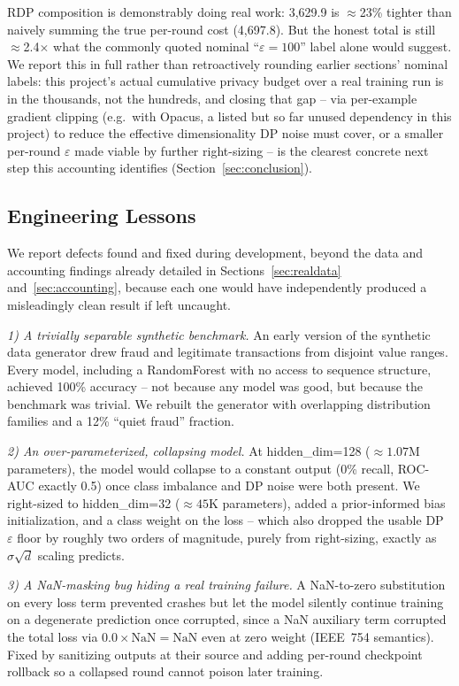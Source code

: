 \documentclass[12pt]{svproc}
\begin{document}
RDP composition is demonstrably doing real work: 3{,}629.9 is
$\approx$23\% tighter than naively summing the true per-round cost
(4{,}697.8). But the honest total is still $\approx$2.4$\times$ what
the commonly quoted nominal ``$\varepsilon=100$'' label alone would
suggest. We report this in full rather than retroactively rounding
earlier sections' nominal labels: this project's actual cumulative
privacy budget over a real training run is in the thousands, not the
hundreds, and closing that gap -- via per-example gradient clipping
(e.g.\ with Opacus, a listed but so far unused dependency in this
project) to reduce the effective dimensionality DP noise must cover, or
a smaller per-round $\varepsilon$ made viable by further right-sizing --
is the clearest concrete next step this accounting identifies
(Section~\ref{sec:conclusion}).

\subsection{Engineering Lessons}
\label{sec:lessons}
We report defects found and fixed during development, beyond the data
and accounting findings already detailed in
Sections~\ref{sec:realdata} and~\ref{sec:accounting}, because each one
would have independently produced a misleadingly clean result if left
uncaught.

\textit{1) A trivially separable synthetic benchmark.} An early version
of the synthetic data generator drew fraud and legitimate transactions
from disjoint value ranges. Every model, including a RandomForest with
no access to sequence structure, achieved 100\% accuracy -- not because
any model was good, but because the benchmark was trivial. We rebuilt
the generator with overlapping distribution families and a 12\%
``quiet fraud'' fraction.

\textit{2) An over-parameterized, collapsing model.} At
hidden\_dim=128 ($\approx1.07$M parameters), the model would collapse
to a constant output (0\% recall, ROC-AUC exactly 0.5) once class
imbalance and DP noise were both present. We right-sized to
hidden\_dim=32 ($\approx45$K parameters), added a prior-informed bias
initialization, and a class weight on the loss -- which also dropped
the usable DP $\varepsilon$ floor by roughly two orders of magnitude,
purely from right-sizing, exactly as $\sigma\sqrt{d}$ scaling predicts.

\textit{3) A NaN-masking bug hiding a real training failure.}
A NaN-to-zero substitution on every loss term prevented crashes but let
the model silently continue training on a degenerate prediction once
corrupted, since a NaN auxiliary term corrupted the total loss via
$0.0 \times \mathrm{NaN} = \mathrm{NaN}$ even at zero weight
(IEEE~754 semantics). Fixed by sanitizing outputs at their source and
adding per-round checkpoint rollback so a collapsed round cannot poison
later training.
\end{document}

